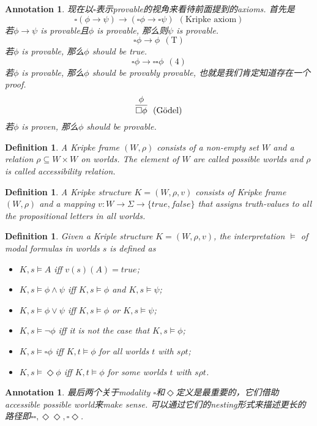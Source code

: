 \documentclass{article}
\theoremstyle{plain}
\newtheorem{definition}[theorem]{Definition}
\newtheorem{annotation}[theorem]{Annotation}
\newcounter{case}
\theoremstyle{nonumberplain}
\begin{document}
\begin{annotation}
\rm 现在以$\square$表示provable的视角来看待前面提到的axioms. 首先是
$$
\square(\phi \to \psi) \to (\square\phi \to \square\psi)~~ (\text{Kripke axiom})
$$
若$\phi \to \psi$ is provable且$\phi$ is provable, 那么则$\psi$ is provable. 
$$
\square\phi \to \phi ~~(\text{T})
$$
若$\phi$ is provable, 那么$\phi$ should be true.
$$
\square\phi \to \square\square\phi ~~(4)
$$
若$\phi$ is provable, 那么$\phi$ should be provably provable, 也就是我们肯定知道存在一个proof. 
$$
\infer{\square \phi}{\phi} ~~(\text{G\"{o}del}) 
$$
若$\phi$ is proven, 那么$\phi$ should be provable. 
\end{annotation}


\begin{definition}
\rm A Kripke frame $(W,\rho)$ consists of a non-empty set $W$ and a relation $\rho \subseteq W \times W$ on worlds. The element of $W$ are called possible worlds and $\rho$ is called accessibility relation. 
\end{definition}

\begin{definition}
\rm A Kripke structure $K = (W, \rho, v)$ consists of Kripke frame $(W,\rho)$ and a mapping $v : W \to \Sigma \to \{true, false\}$ that assigns truth-values to all the propositional letters in all worlds.
\end{definition}

\begin{definition}
\rm Given a Kriple structure $K=(W, \rho, v)$, the interpretation  $\vDash$ of modal formulas in worlds $s$ is defined as
\begin{itemize}
	\item $K, s \vDash A$ iff $v(s)(A) = true$;
	\item $K, s \vDash \phi \wedge \psi$ iff $K, s \vDash \phi$ and $K, s \vDash \psi$;
	\item $K, s \vDash \phi \vee \psi$ iff $K, s \vDash \phi$ or $K, s \vDash \psi$;
	\item $K, s \vDash \neg \phi$ iff it is not the case that $K, s \vDash \phi$;
	\item $K, s \vDash \square \phi$ iff $K, t \vDash \phi$ for all worlds $t$ with $s \rho t$;
	\item $K, s \vDash \Diamond \phi$ iff $K, t \vDash \phi$ for some worlds $t$ with $s \rho t$.
\end{itemize}
\end{definition}

\begin{annotation}
\rm 最后两个关于modality $\square$和$\Diamond$定义是最重要的，它们借助accessible possible world来make sense. 可以通过它们的nesting形式来描述更长的路径即$\square\square,\Diamond\Diamond,\square\Diamond$. 
\end{annotation}
\end{document}
